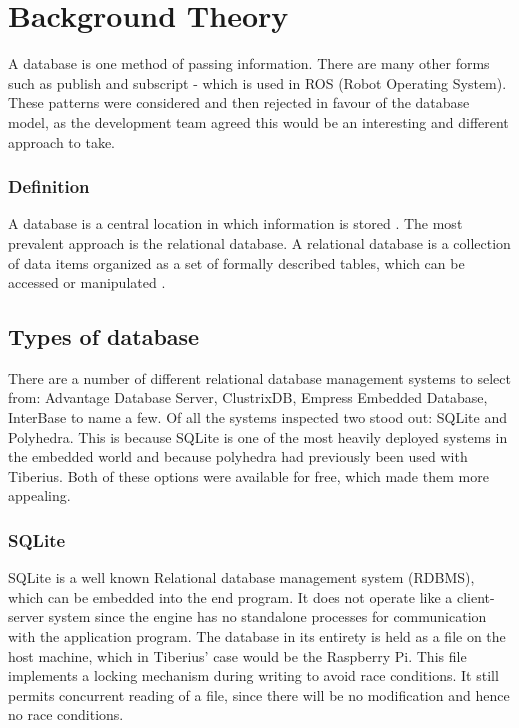 \section{Background Theory}
A database is one method of passing information. There are many other forms such as publish and subscript - which is used in ROS (Robot Operating System).  These patterns were considered and then rejected in favour of the database model, as the development team agreed this would be an interesting and different approach to take.

\subsubsection{Definition}
A database is a central location in which information is stored \cite{databasedefinition}. The most prevalent approach is the relational database. A relational database is a collection of data items organized as a set of formally described tables, which can be accessed or manipulated \cite{relationaldatabasedefinition}.

\subsection{Types of database}
There are a number of different relational database management systems to select from: Advantage Database Server, ClustrixDB, Empress Embedded Database, InterBase to name a few. Of all the systems inspected two stood out: SQLite and Polyhedra. This is because SQLite is one of the most heavily deployed systems in the embedded world and because polyhedra had previously been used with Tiberius. Both of these options were available for free, which made them more appealing.

\subsubsection{SQLite}
SQLite is a well known Relational database management system (RDBMS), which can be embedded into the end program. It does not operate like a client-server system since the engine has no standalone processes for communication with the application program. The database in its entirety is held as a file on the host machine, which in Tiberius' case would be the Raspberry Pi. This file implements a locking mechanism during writing to avoid race conditions. It still permits concurrent reading of a file, since there will be no modification and hence no race conditions. 

